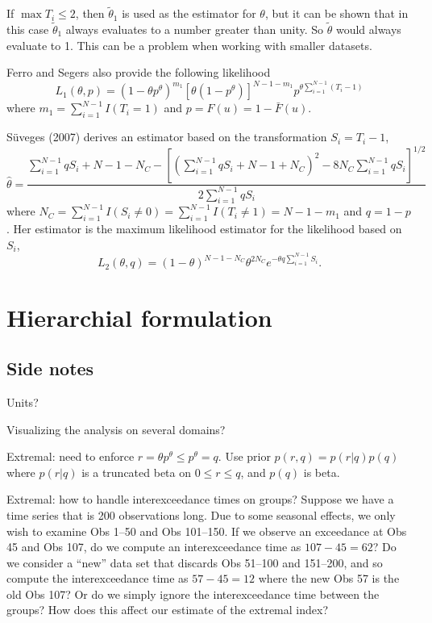 \documentclass[12pt]{article}
\begin{document}
If $\max{T_i}\leq 2$, then $\tilde{\theta}_1$ is used as the estimator for $\theta$, but it can be shown that in this case $\tilde{\theta}_1$ always evaluates to a number greater than unity. So $\widetilde{\theta}$ would always evaluate to 1. This can be a problem when working with smaller datasets.
\bigskip

Ferro and Segers also provide the following likelihood
\[ L_1(\theta, p) = (1-\theta p^\theta)^{m_1}[\theta(1-p^\theta)]^{N-1-m_1}p^{\theta\sum_{i=1}^{N-1}(T_i-1)} \]
where $m_1=\sum_{i=1}^{N-1}I(T_i=1)$ and $p=F(u)=1-\bar{F}(u)$.
\bigskip

S{\"u}veges (2007) derives an estimator based on the transformation $S_i=T_i-1$,
\[ \hat{\theta} = \frac{ \sum_{i=1}^{N-1}qS_i +N-1-N_C-\left[\left(\sum_{i=1}^{N-1}qS_i+N-1+N_C\right)^2-8N_C\sum_{i=1}^{N-1}qS_i\right]^{1/2}}{2\sum_{i=1}^{N-1}qS_i} \]
where $N_C=\sum_{i=1}^{N-1}I(S_i\neq 0)=\sum_{i=1}^{N-1}I(T_i \neq 1)=N-1-m_1$ and $q=1-p$. Her estimator is the maximum likelihood estimator for the likelihood based on $S_i$,
\[ L_2(\theta, q)= (1-\theta)^{N-1-N_C}\theta^{2N_C}e^{-\theta q \sum_{i=1}^{N-1}S_i}. \]
\bigskip















\section{Hierarchial formulation}





\subsection*{Side notes}

Units?
\bigskip

Visualizing the analysis on several domains?
\bigskip

Extremal: need to enforce $r = \theta p^\theta \leq p^\theta = q$. Use prior $p(r,q)=p(r|q)p(q)$ where $p(r|q)$ is a truncated beta on $0\leq r \leq q$, and $p(q)$ is beta.
\bigskip

Extremal: how to handle interexceedance times on groups? Suppose we have a time series that is 200 observations long. Due to some seasonal effects, we only wish to examine Obs 1--50 and Obs 101--150. If we observe an exceedance at Obs 45 and Obs 107, do we compute an interexceedance time as $107-45=62$? Do we consider a ``new'' data set that discards Obs 51--100 and 151--200, and so compute the interexceedance time as $57-45=12$ where the new Obs 57 is the old Obs 107? Or do we simply ignore the interexceedance time between the groups? How does this affect our estimate of the extremal index?
\end{document}
